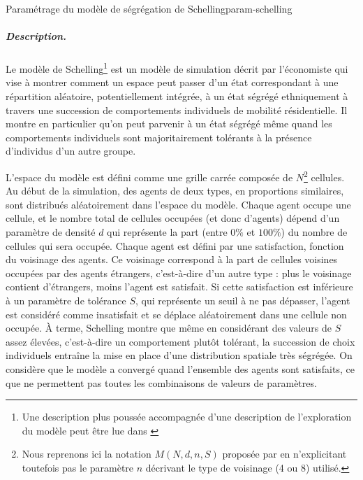 \begin{encadre}{Paramétrage du modèle de ségrégation de Schelling}{param-schelling}
\renewcommand{\thempfootnote}{\alph{mpfootnote}}

\subparagraph{Description.}
Le modèle de Schelling\footnote{
	Une description plus poussée accompagnée d'une description de l'exploration du modèle peut être lue dans \autocite{daude_comparaison_2006}
} est un modèle de simulation décrit par l'économiste \textcite{schelling_dynamic_1971} qui vise à montrer comment un espace peut passer d'un état correspondant à une répartition aléatoire, potentiellement intégrée, à un état ségrégé ethniquement à travers une succession de comportements individuels de mobilité résidentielle.
Il montre en particulier qu'on peut parvenir à un état ségrégé même quand les comportements individuels sont majoritairement tolérants à la présence d'individus d'un autre groupe.

L'espace du modèle est défini comme une grille carrée composée de $N$\footnote{
	Nous reprenons ici la notation $M(N, d, n, S)$ proposée par \textcite[433]{daude_comparaison_2006} en n'explicitant toutefois pas le paramètre $n$ décrivant le type de voisinage (4 ou 8) utilisé.
} cellules.
Au début de la simulation, des agents de deux types, en proportions similaires, sont distribués aléatoirement dans l'espace du modèle.
Chaque agent occupe une cellule, et le nombre total de cellules occupées (et donc d'agents) dépend d'un paramètre de densité $d$ qui représente la part (entre $0\%$ et $100\%$) du nombre de cellules qui sera occupée.
Chaque agent est défini par une satisfaction, fonction du voisinage des agents.
Ce voisinage correspond à la part de cellules voisines occupées par des agents \og étrangers\fg{}, c'est-à-dire d'un autre type : plus le voisinage contient d'étrangers, moins l'agent est satisfait.
Si cette satisfaction est inférieure à un paramètre de tolérance $S$, qui représente un seuil à ne pas dépasser, l'agent est considéré comme insatisfait et se déplace aléatoirement dans une cellule non occupée.
À terme, Schelling montre que même en considérant des valeurs de $S$ assez élevées, c'est-à-dire un comportement plutôt tolérant, la succession de choix individuels entraîne la mise en place d'une distribution spatiale très ségrégée.
On considère que le modèle a convergé quand l'ensemble des agents sont satisfaits, ce que ne permettent pas toutes les combinaisons de valeurs de paramètres.


\end{encadre}
